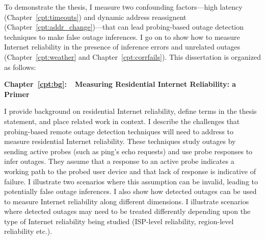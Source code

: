 To demonstrate the thesis, I measure two confounding factors---high
latency (Chapter~\ref{cpt:timeouts}) and dynamic address reassignent
(Chapter~\ref{cpt:addr_change})---that can lead probing-based outage
detection techniques to make false outage inferences. I go on to show how
to measure Internet reliability in the presence of inference errors
and unrelated outages (Chapter~\ref{cpt:weather} and
Chapter~\ref{cpt:corrfails}). This dissertation is organized as follows:



\textbf{Chapter~\ref{cpt:bg}:~~Measuring Residential Internet
  Reliability: a Primer}

I provide background on residential
Internet reliability, define terms in the thesis statement, and place
related work in context. I describe the challenges that probing-based
remote outage detection techniques will need to address to measure
residential Internet reliability. These techniques study outages by
sending active probes (such as ping's echo requests) and use probe
responses to infer outages. They assume that a response to an active
probe indicates a working path to the probed user device and that lack
of response is indicative of failure. I illustrate two scenarios where
this assumption can be invalid, leading to potentially false outage
inferences. I also show how detected outages can be used to measure
Internet reliability along different dimensions. I illustrate
scenarios where detected outages may
need to be treated differently depending upon the type of
Internet reliability being studied (ISP-level reliability,
region-level reliability etc.).

